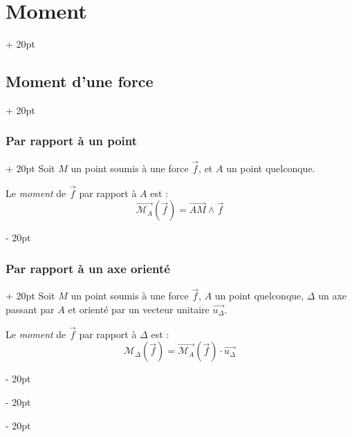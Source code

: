 \documentclass[a4paper, 12pt, twoside]{article}
\newcommand{\vect}{\overrightarrow}
\newcommand{\lr}[1]{\left( #1 \right)}
\newcommand{\ind}[1][20pt]{\advance\leftskip + #1}
\newcommand{\deind}[1][20pt]{\advance\leftskip - #1}
\newenvironment{indt}[2][20pt]{#2 \par \ind[#1]}{\par \deind} %
\begin{document}
    \begin{indt}{\section{Moment}}
        \begin{indt}{\subsection{Moment d'une force}}
            \begin{indt}{\subsubsection{Par rapport à un point}}
                Soit $M$ un point soumis à une force $\vec f$, et $A$ un point quelconque.

                \vspace{6pt}
                
                Le \textit{moment} de $\vec f$ par rapport à $A$ est :
                \[
                    \vect{\mathscr M_A}\!\lr{\vec f} = \vect{AM} \wedge \vec f
                \]
            \end{indt}

            \vspace{12pt}
            
            \begin{indt}{\subsubsection{Par rapport à un axe orienté}}
                Soit $M$ un point soumis à une force $\vec f$, $A$ un point quelconque, $\Delta$ un axe passant par $A$ et orienté par un vecteur unitaire $\vect{u_\Delta}$.

                \vspace{6pt}
                
                Le \textit{moment} de $\vec f$ par rapport à $\Delta$ est :
                \[
                    \mathscr M_\Delta\!\lr{\vec f} = \vect{\mathscr M_A}\!\lr{\vec f} \cdot \vect{u_\Delta}
                \]

                \vspace{6pt}
                

\end{indt}
\end{indt}
\end{indt}
\end{document}
